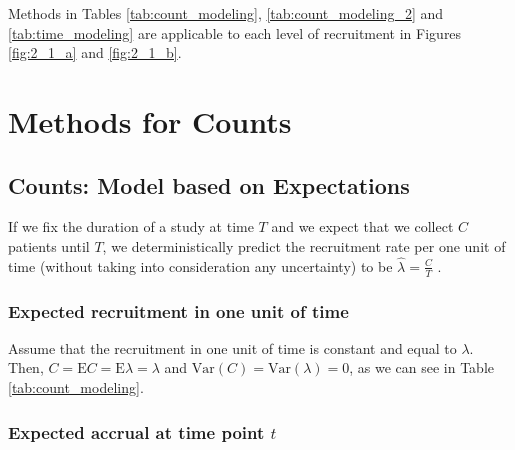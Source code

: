 

Methods in Tables \ref{tab:count_modeling}, \ref{tab:count_modeling_2} and \ref{tab:time_modeling} are applicable to each level of recruitment in Figures \ref{fig:2_1_a} and \ref{fig:2_1_b}.

\chapter{Methods for Counts} 
\section{Counts: Model based on Expectations}
\label{sec:expect}

If we fix the duration of a study at time $T$ and we expect that we collect $C$ patients until $T$, we deterministically predict the recruitment rate per one unit of time (without taking into consideration any uncertainty) to be $\hat{\lambda}=\frac{C}{T}$ \citep{carter2004application}. 




\subsection{Expected recruitment in one unit of time}

Assume that the recruitment in one unit of time is constant and equal to $\lambda$. Then, $C = \textrm{E}C = \textrm{E}\lambda = \lambda$ and $\textrm{Var}(C) = \textrm{Var}(\lambda) = 0$, as we can see in Table \ref{tab:count_modeling}.

\subsection{Expected accrual at time point $t$}

